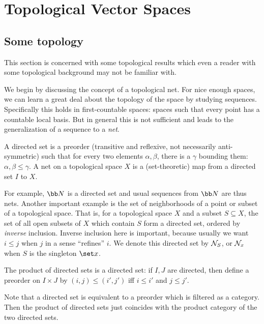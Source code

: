 \section{Topological Vector Spaces}

\subsection{Some topology}

This section is concerned with some topological results which even a reader with some topological background may not be familiar with.

We begin by discussing the concept of a topological net.
For nice enough spaces, we can learn a great deal about the topology of the space by studying sequences.
Specifically this holds in first-countable spaces: spaces such that every point has a countable local basis.
But in general this is not sufficient and leads to the generalization of a sequence to a {\it net}.

\bdefn

    A {\emphcolor directed set} is a preorder (transitive and reflexive, not necessarily anti-symmetric) such that for every two elements $\alpha,\beta$,
    there is a $\gamma$ bounding them: $\alpha,\beta\leq\gamma$.
    A {\emphcolor net} on a topological space $X$ is a (set-theoretic) map from a directed set $I$ to $X$.

\edefn

For example, $\bN$ is a directed set and usual sequences from $\bN$ are thus nets.
Another important example is the set of neighborhoods of a point or subset of a topological space.
That is, for a topological space $X$ and a subset $S\subseteq X$, the set of all open subsets of $X$ which contain $S$ form a directed set, ordered by {\it inverse\/} inclusion.
Inverse inclusion here is important, because usually we want $i\leq j$ when $j$ in a sense ``refines'' $i$.
We denote this directed set by ${{\cal N}}_S$, or ${{\cal N}}_x$ when $S$ is the singleton $\set x$.

The product of directed sets is a directed set: if $I,J$ are directed, then define a preorder on $I\times J$ by $(i,j)\leq(i',j')$ iff $i\leq i'$ and $j\leq j'$.

Note that a directed set is equivalent to a preorder which is filtered as a category.
Then the product of directed sets just coincides with the product category of the two directed sets.

\bdefn

